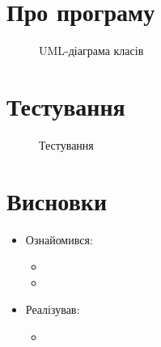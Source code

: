 \documentclass[../../../../document]{subfiles}
\begin{document}
	\chapter{Про програму}

	\begin{figure}[htb]
		\centering
		\caption{UML-діаграма класів}
		\label{fig:classdiagram}
	\end{figure}

	\chapter{Тестування}
	\begin{figure}[htb]
		\centering
		\caption{Тестування}
		\label{fig:tag}
	\end{figure}

	\chapter{Висновки}
	\begin{itemize}
		\item Ознайомився:
			\begin{itemize}
				\item
				\item
			\end{itemize}
		\item Реалізував:
			\begin{itemize}
				\item
			\end{itemize}
	\end{itemize}
\end{document}
